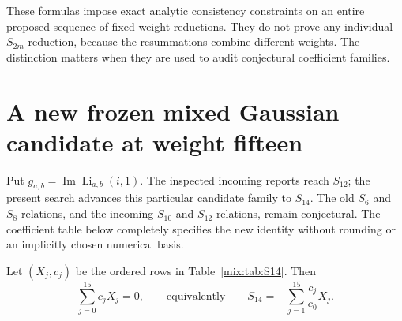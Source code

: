 These formulas impose exact analytic consistency constraints on an
entire proposed sequence of fixed-weight reductions. They do not prove
any individual $S_{2m}$ reduction, because the resummations combine
different weights. The distinction matters when they are used to audit
conjectural coefficient families.

\section{A new frozen mixed Gaussian candidate at weight fifteen}
\label{mix:sec:S14}

Put $g_{a,b}=\operatorname{Im}\operatorname{Li}_{a,b}(i,1)$.
The inspected incoming reports reach $S_{12}$; the present search advances
this particular candidate family to $S_{14}$.  The old $S_6$ and $S_8$
relations, and the incoming $S_{10}$ and $S_{12}$ relations, remain
conjectural.  The coefficient table below completely specifies the new
identity without rounding or an implicitly chosen numerical basis.

\begin{conjecture}
\label{mix:conj:S14}
Let $(X_j,c_j)$ be the ordered rows in Table~\ref{mix:tab:S14}. Then
\begin{equation}\label{mix:eq:S14}
 \sum_{j=0}^{15}c_jX_j=0,
 \qquad\text{equivalently}\qquad
 S_{14}=-\sum_{j=1}^{15}\frac{c_j}{c_0}X_j.
\end{equation}
\end{conjecture}

